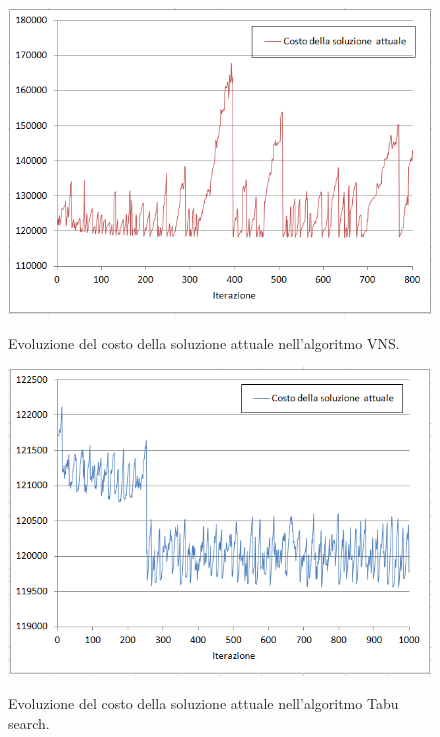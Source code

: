 \begin{figure}[h]
\begin{center} 
  \includegraphics[scale=0.7]{Images/cost_vns}\\ 
  \caption{\footnotesize{Evoluzione del costo della soluzione attuale nell'algoritmo VNS.}}
  \label{cost_vns} 
\end{center} 
\end{figure}
\begin{figure}[h] 
\begin{center} 
  \includegraphics[scale=0.7]{Images/cost_tabu}\\ 
  \caption{\footnotesize{Evoluzione del costo della soluzione attuale nell'algoritmo Tabu search.}}
  \label{cost_tabu} 
\end{center} 
\end{figure}
